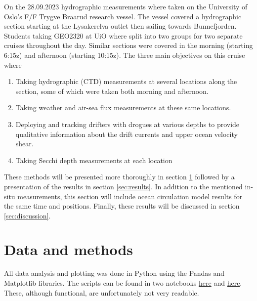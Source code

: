 \documentclass[a4paper,10pt,english]{article}
\begin{document}
On the 28.09.2023 hydrographic measurements where taken on the University of Oslo's F/F Trygve Braarud research vessel. The vessel covered a hydrographic section starting at the Lysakerelva outlet then sailing towards Bunnefjorden. Students taking GEO2320 at UiO where split into two groups for two separate cruises throughout the day. Similar sections were covered in the morning (starting 6:15z) and afternoon (starting 10:15z). The three main objectives on this cruise where
\begin{enumerate}[label=(\roman*)]
        \item Taking hydrographic (CTD) measurements at several locations
        along the section, some of which were taken both morning and afternoon.
        \item Taking weather and air-sea flux
        measurements at these same locations.
       \item Deploying and tracking drifters with drogues at
        various depths to provide qualitative information about the drift currents and upper ocean velocity shear.
        \item Taking Secchi depth measurements at each location
\end{enumerate}
These methods will be presented more thoroughly in section \ref*{sec:methods} followed by a presentation of the results in section \ref*{sec:results}. In addition to the mentioned in-situ measurements, this section will include ocean circulation model results for the same time and positions. Finally, these results will be discussed in section \ref*{sec:discussion}.%

\section{Data and methods}\label{sec:methods}
All data analysis and plotting was done in Python using the Pandas and Matplotlib libraries. The scripts can be found in two notebooks \href{https://github.com/Alessimc/geo2320_oceanography/blob/main/cruise/hydrographic_plots.ipynb}{here} and \href{https://github.com/Alessimc/geo2320_oceanography/blob/main/cruise/combinedplots.ipynb}{here}. These, although functional, are unfortunately not very readable.
\end{document}
